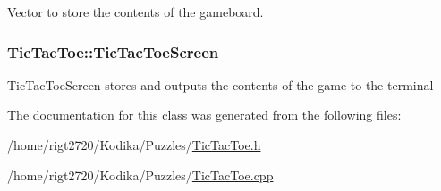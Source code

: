 Vector to store the contents of the gameboard. 

\hypertarget{classTicTacToe_a6749582a8480be3cbae920f8f2cca8ce}{
\subsubsection[{Tic\-Tac\-Toe\-Screen}]{ Tic\-Tac\-Toe\-::\-Tic\-Tac\-Toe\-Screen\hspace{0.3cm}{\ttfamily [private]}}}\label{classTicTacToe_a6749582a8480be3cbae920f8f2cca8ce}
Tic\-Tac\-Toe\-Screen stores and outputs the contents of the game to the terminal 

The documentation for this class was generated from the following files\-:\begin{DoxyCompactItemize}
\item 
/home/rigt2720/\-Kodika/\-Puzzles/\hyperlink{TicTacToe_8h}{Tic\-Tac\-Toe.\-h}\item 
/home/rigt2720/\-Kodika/\-Puzzles/\hyperlink{TicTacToe_8cpp}{Tic\-Tac\-Toe.\-cpp}\end{DoxyCompactItemize}
